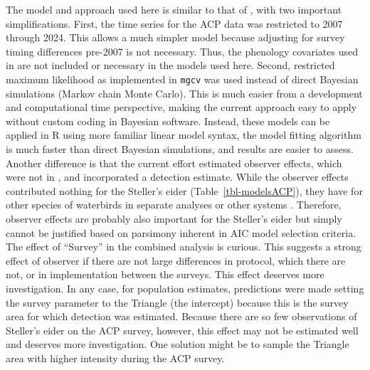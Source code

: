\documentclass[
  10pt,
  letterpaper,
]{article}
\begin{document}
The model and approach used here is similar to that of
\citep{amundson2019}, with two important simplifications. First, the
time series for the ACP data was restricted to 2007 through 2024. This
allows a much simpler model because adjusting for survey timing
differences pre-2007 is not necessary. Thus, the phenology covariates
used in \citep{amundson2019} are not included or necessary in the models
used here. Second, restricted maximum likelihood as implemented in
\texttt{mgcv} \citep{wood2011fast} was used instead of direct Bayesian
simulations (Markov chain Monte Carlo). This is much easier from a
development and computational time perspective, making the current
approach easy to apply without custom coding in Bayesian software.
Instead, these models can be applied in R using more familiar linear
model syntax, the model fitting algorithm is much faster than direct
Bayesian simulations, and results are easier to assess. Another
difference is that the current effort estimated observer effects, which
were not in \citep{amundson2019}, and incorporated a detection estimate.
While the observer effects contributed nothing for the Steller's eider
(Table~\ref{tbl-modelsACP}), they have for other species of waterbirds
in separate analyses \citep{wilson2025population} or other systems
\citep{sauer1994observer} \citep{fink2023double}. Therefore, observer
effects are probably also important for the Steller's eider but simply
cannot be justified based on parsimony inherent in AIC model selection
criteria. The effect of ``Survey'' in the combined analysis is curious.
This suggests a strong effect of observer if there are not large
differences in protocol, which there are not, or in implementation
between the surveys. This effect deserves more investigation. In any
case, for population estimates, predictions were made setting the survey
parameter to the Triangle (the intercept) because this is the survey
area for which detection was estimated. Because there are so few
observations of Steller's eider on the ACP survey, however, this effect
may not be estimated well and deserves more investigation. One solution
might be to sample the Triangle area with higher intensity during the
ACP survey.
\end{document}
